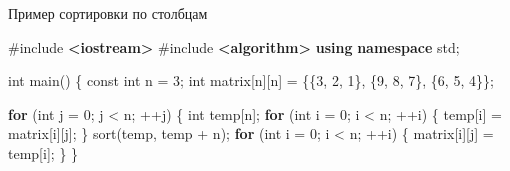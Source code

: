\documentclass[
]{article}
\newenvironment{Shaded}{}{}
\newcommand{\AttributeTok}[1]{\textcolor[rgb]{0.49,0.56,0.16}{#1}}
\newcommand{\ControlFlowTok}[1]{\textcolor[rgb]{0.00,0.44,0.13}{\textbf{#1}}}
\newcommand{\DataTypeTok}[1]{\textcolor[rgb]{0.56,0.13,0.00}{#1}}
\newcommand{\DecValTok}[1]{\textcolor[rgb]{0.25,0.63,0.44}{#1}}
\newcommand{\ImportTok}[1]{\textcolor[rgb]{0.00,0.50,0.00}{\textbf{#1}}}
\newcommand{\KeywordTok}[1]{\textcolor[rgb]{0.00,0.44,0.13}{\textbf{#1}}}
\newcommand{\NormalTok}[1]{#1}
\newcommand{\OperatorTok}[1]{\textcolor[rgb]{0.40,0.40,0.40}{#1}}
\newcommand{\PreprocessorTok}[1]{\textcolor[rgb]{0.74,0.48,0.00}{#1}}
\begin{document}
Пример сортировки по столбцам

\begin{Shaded}
\begin{Highlighting}[]
\PreprocessorTok{\#include }\ImportTok{\textless{}iostream\textgreater{}}
\PreprocessorTok{\#include }\ImportTok{\textless{}algorithm\textgreater{}}
\KeywordTok{using} \KeywordTok{namespace}\NormalTok{ std}\OperatorTok{;}

\DataTypeTok{int}\NormalTok{ main}\OperatorTok{()} \OperatorTok{\{}
    \AttributeTok{const} \DataTypeTok{int}\NormalTok{ n }\OperatorTok{=} \DecValTok{3}\OperatorTok{;}
    \DataTypeTok{int}\NormalTok{ matrix}\OperatorTok{[}\NormalTok{n}\OperatorTok{][}\NormalTok{n}\OperatorTok{]} \OperatorTok{=} \OperatorTok{\{\{}\DecValTok{3}\OperatorTok{,} \DecValTok{2}\OperatorTok{,} \DecValTok{1}\OperatorTok{\},}
                        \OperatorTok{\{}\DecValTok{9}\OperatorTok{,} \DecValTok{8}\OperatorTok{,} \DecValTok{7}\OperatorTok{\},}
                        \OperatorTok{\{}\DecValTok{6}\OperatorTok{,} \DecValTok{5}\OperatorTok{,} \DecValTok{4}\OperatorTok{\}\};}

    \ControlFlowTok{for} \OperatorTok{(}\DataTypeTok{int}\NormalTok{ j }\OperatorTok{=} \DecValTok{0}\OperatorTok{;}\NormalTok{ j }\OperatorTok{\textless{}}\NormalTok{ n}\OperatorTok{;} \OperatorTok{++}\NormalTok{j}\OperatorTok{)} \OperatorTok{\{}
        \DataTypeTok{int}\NormalTok{ temp}\OperatorTok{[}\NormalTok{n}\OperatorTok{];}
        \ControlFlowTok{for} \OperatorTok{(}\DataTypeTok{int}\NormalTok{ i }\OperatorTok{=} \DecValTok{0}\OperatorTok{;}\NormalTok{ i }\OperatorTok{\textless{}}\NormalTok{ n}\OperatorTok{;} \OperatorTok{++}\NormalTok{i}\OperatorTok{)} \OperatorTok{\{}
\NormalTok{            temp}\OperatorTok{[}\NormalTok{i}\OperatorTok{]} \OperatorTok{=}\NormalTok{ matrix}\OperatorTok{[}\NormalTok{i}\OperatorTok{][}\NormalTok{j}\OperatorTok{];}
        \OperatorTok{\}}
\NormalTok{        sort}\OperatorTok{(}\NormalTok{temp}\OperatorTok{,}\NormalTok{ temp }\OperatorTok{+}\NormalTok{ n}\OperatorTok{);}
        \ControlFlowTok{for} \OperatorTok{(}\DataTypeTok{int}\NormalTok{ i }\OperatorTok{=} \DecValTok{0}\OperatorTok{;}\NormalTok{ i }\OperatorTok{\textless{}}\NormalTok{ n}\OperatorTok{;} \OperatorTok{++}\NormalTok{i}\OperatorTok{)} \OperatorTok{\{}
\NormalTok{            matrix}\OperatorTok{[}\NormalTok{i}\OperatorTok{][}\NormalTok{j}\OperatorTok{]} \OperatorTok{=}\NormalTok{ temp}\OperatorTok{[}\NormalTok{i}\OperatorTok{];}
        \OperatorTok{\}}
    \OperatorTok{\}}


\end{Highlighting}
\end{Shaded}
\end{document}
